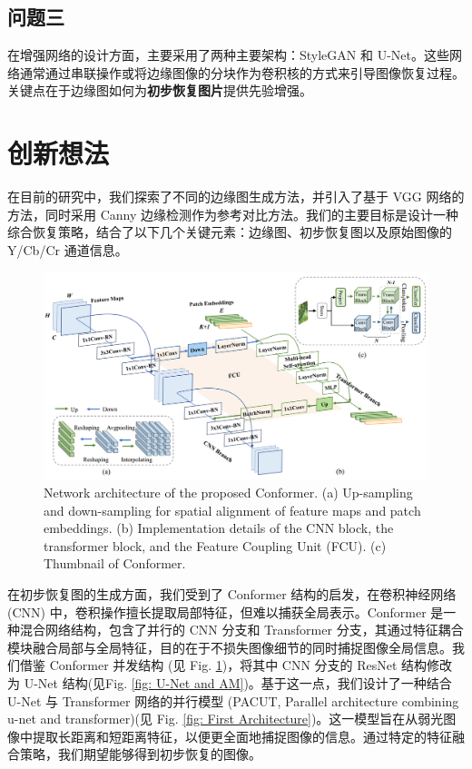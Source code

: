 \documentclass[a4paper, 10pt]{article}
\begin{document}
		\subsection{问题三}
		
		在增强网络的设计方面，主要采用了两种主要架构：StyleGAN 和 U-Net。这些网络通常通过串联操作或将边缘图像的分块作为卷积核的方式来引导图像恢复过程。关键点在于边缘图如何为\textbf{初步恢复图片}提供先验增强。
		
	\section{创新想法}
		
		在目前的研究中，我们探索了不同的边缘图生成方法，并引入了基于 VGG 网络的方法，同时采用 Canny 边缘检测作为参考对比方法。我们的主要目标是设计一种综合恢复策略，结合了以下几个关键元素：边缘图、初步恢复图以及原始图像的 Y/Cb/Cr 通道信息。
		
		\begin{figure}[htbp]
			\centering 
			\includegraphics[width=\columnwidth]{picture/LLIE/Conformer/the proposed Conformer}
			\caption{
				\label{fig: Conformer architecture} 
				Network architecture of the proposed Conformer. (a) Up-sampling and down-sampling for spatial alignment of
				feature maps and patch embeddings. (b) Implementation details of the CNN block, the transformer block, and the Feature Coupling Unit (FCU). (c) Thumbnail of Conformer.
			}
		\end{figure}
		
		在初步恢复图的生成方面，我们受到了 Conformer\cite{peng2021conformer} 结构的启发，在卷积神经网络 (CNN) 中，卷积操作擅长提取局部特征，但难以捕获全局表示。Conformer 是一种混合网络结构，包含了并行的 CNN 分支和 Transformer 分支，其通过特征耦合模块融合局部与全局特征，目的在于不损失图像细节的同时捕捉图像全局信息。我们借鉴 Conformer 并发结构 (见 Fig. \ref{fig: Conformer architecture})，将其中 CNN 分支的 ResNet 结构修改为 U-Net 结构(见Fig. \ref{fig: U-Net and AM})。基于这一点，我们设计了一种结合 U-Net 与 Transformer 网络的并行模型 (PACUT, Parallel architecture combining u-net and transformer)(见 Fig. \ref{fig: First Architecture})。这一模型旨在从弱光图像中提取长距离和短距离特征，以便更全面地捕捉图像的信息。通过特定的特征融合策略，我们期望能够得到初步恢复的图像。
		
\end{document}

